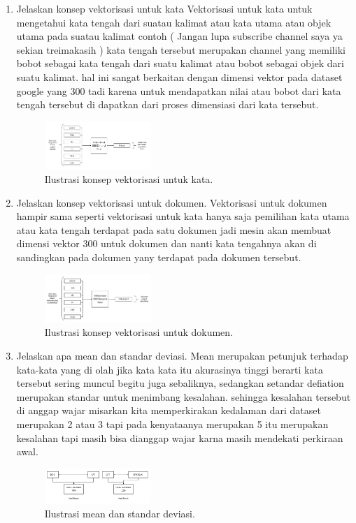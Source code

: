 \begin{enumerate}
	\item Jelaskan konsep vektorisasi untuk kata
	\hfill\break
	Vektorisasi untuk kata untuk mengetahui kata tengah dari suatau kalimat atau kata utama atau objek utama pada suatau kalimat contoh ( Jangan lupa subscribe channel saya ya sekian treimakasih ) kata tengah tersebut merupakan channel yang memiliki bobot sebagai kata tengah dari suatu kalimat atau bobot sebagai objek dari suatu kalimat. hal ini sangat berkaitan dengan dimensi vektor pada dataset google yang 300 tadi karena untuk mendapatkan nilai atau bobot dari kata tengah tersebut di dapatkan dari proses dimensiasi dari kata tersebut. 
    \begin{figure}[H]
	\centering
		\includegraphics[width=4cm]{figures/1174096/tugas5/1-3.PNG}
		\caption{Ilustrasi konsep vektorisasi untuk kata.}
	\end{figure}

	\item Jelaskan konsep vektorisasi untuk dokumen.
	\hfill\break
	Vektorisasi untuk dokumen hampir sama seperti vektorisasi untuk kata hanya saja pemilihan kata utama atau kata tengah terdapat pada satu dokumen jadi mesin akan membuat dimensi vektor 300 untuk dokumen dan nanti kata tengahnya akan di sandingkan pada dokumen yany terdapat pada dokumen tersebut.
    \begin{figure}[H]
	\centering
		\includegraphics[width=4cm]{figures/1174096/tugas5/1-4.PNG}
		\caption{Ilustrasi konsep vektorisasi untuk dokumen.}
	\end{figure}

	\item Jelaskan apa mean dan standar deviasi.
	\hfill\break
	Mean merupakan petunjuk terhadap kata-kata yang di olah jika kata kata itu akurasinya tinggi berarti kata tersebut sering muncul begitu juga sebaliknya, sedangkan setandar defiation merupakan standar untuk menimbang kesalahan. sehingga kesalahan tersebut di anggap wajar misarkan kita memperkirakan kedalaman dari dataset merupakan 2 atau 3 tapi pada kenyataanya merupakan 5 itu merupakan kesalahan tapi masih bisa dianggap wajar karna masih mendekati perkiraan awal.
	\begin{figure}[H]
	\centering
		\includegraphics[width=4cm]{figures/1174096/tugas5/1-5.PNG}
		\caption{Ilustrasi mean dan standar deviasi.}
	\end{figure}


\end{enumerate}
